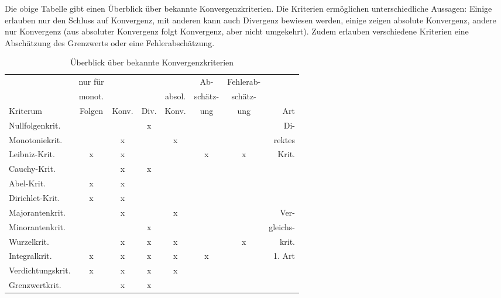 Die obige Tabelle gibt einen Überblick über bekannte Konvergenzkriterien. Die Kriterien ermöglichen unterschiedliche Aussagen: Einige erlauben nur den Schluss auf Konvergenz, mit anderen kann auch Divergenz bewiesen werden, einige zeigen absolute Konvergenz, andere nur Konvergenz (aus absoluter Konvergenz folgt Konvergenz, aber nicht umgekehrt). Zudem erlauben verschiedene Kriterien eine Abschätzung des Grenzwerts oder eine Fehlerabschätzung.

\begin{table}
\centering
\caption{Überblick über bekannte Konvergenzkriterien}
\label{table-overview-conv}
\begin{tabular}{lccccccr}
\hline
                  & nur für &       &      &        & Ab-     & Fehlerab- &           \\
                  & monot.  &       &      & absol. & schätz- & schätz-   &           \\
Kriterum          & Folgen  & Konv. & Div. & Konv.  & ung     & ung       & Art       \\ \hline
Nullfolgenkrit.   &         &       & x    &        &         &           & Di- \\
Monotoniekrit.    &         & x     &      & x      &         &           & rektes \\
Leibniz-Krit.     & x       & x     &      &        & x       & x         &      Krit.     \\
Cauchy-Krit.      &         & x     & x    &        &         &           &           \\
Abel-Krit.        & x       & x     &      &        &         &           &           \\
Dirichlet-Krit.   & x       & x     &      &        &         &           &           \\ \hline 
Majorantenkrit.   &         & x     &      & x      &         &           & Ver-      \\
Minorantenkrit.   &         &       & x    &        &         &           & gleichs-  \\
Wurzelkrit.       &         & x     & x    & x      &         & x         & krit. \\
Integralkrit.     & x       & x     & x    & x      & x       &           & 1. Art    \\
Verdichtungskrit. & x       & x     & x    & x      &         &           &           \\
Grenzwertkrit.    &         & x     & x    &        &         &           &           \\ \hline 

\end{tabular}
\end{table}
